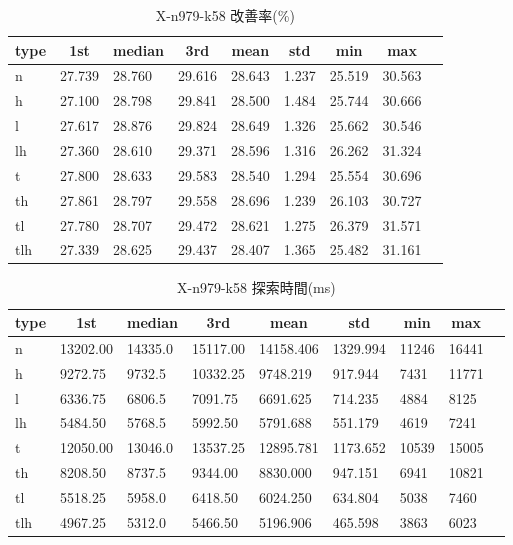 \begin{table}[htbp]
    \centering
    \caption{X-n979-k58 改善率(\%)}
    \begin{tabular}{|l|l|l|l|l|l|l|l|l|}\hline
    \multicolumn{1}{|c|}{\textbf{type}}
    &\multicolumn{1}{|c|}{\textbf{1st}}
    &\multicolumn{1}{c|}{\textbf{median}}
    &\multicolumn{1}{c|}{\textbf{3rd}}
    &\multicolumn{1}{c|}{\textbf{mean}}
    &\multicolumn{1}{c|}{\textbf{std}}
    &\multicolumn{1}{c|}{\textbf{min}}
    &\multicolumn{1}{c|}{\textbf{max}}\\\hline
	n & 27.739 & 28.760 & 29.616 & 28.643 & 1.237 & 25.519 & 30.563\\\hline
	h & 27.100 & 28.798 & 29.841 & 28.500 & 1.484 & 25.744 & 30.666\\\hline
	l & 27.617 & 28.876 & 29.824 & 28.649 & 1.326 & 25.662 & 30.546\\\hline
	lh & 27.360 & 28.610 & 29.371 & 28.596 & 1.316 & 26.262 & 31.324\\\hline
	t & 27.800 & 28.633 & 29.583 & 28.540 & 1.294 & 25.554 & 30.696\\\hline
	th & 27.861 & 28.797 & 29.558 & 28.696 & 1.239 & 26.103 & 30.727\\\hline
	tl & 27.780 & 28.707 & 29.472 & 28.621 & 1.275 & 26.379 & 31.571\\\hline
	tlh & 27.339 & 28.625 & 29.437 & 28.407 & 1.365 & 25.482 & 31.161\\\hline
	\end{tabular}
\end{table}
\begin{table}[htbp]
    \centering
    \caption{X-n979-k58 探索時間(ms)}
    \begin{tabular}{|l|l|l|l|l|l|l|l|l|}\hline
    \multicolumn{1}{|c|}{\textbf{type}}
    &\multicolumn{1}{|c|}{\textbf{1st}}
    &\multicolumn{1}{c|}{\textbf{median}}
    &\multicolumn{1}{c|}{\textbf{3rd}}
    &\multicolumn{1}{c|}{\textbf{mean}}
    &\multicolumn{1}{c|}{\textbf{std}}
    &\multicolumn{1}{c|}{\textbf{min}}
    &\multicolumn{1}{c|}{\textbf{max}}\\\hline
	n & 13202.00 & 14335.0 & 15117.00 & 14158.406 & 1329.994 & 11246 & 16441\\\hline
	h & 9272.75 & 9732.5 & 10332.25 & 9748.219 & 917.944 & 7431 & 11771\\\hline
	l & 6336.75 & 6806.5 & 7091.75 & 6691.625 & 714.235 & 4884 & 8125\\\hline
	lh & 5484.50 & 5768.5 & 5992.50 & 5791.688 & 551.179 & 4619 & 7241\\\hline
	t & 12050.00 & 13046.0 & 13537.25 & 12895.781 & 1173.652 & 10539 & 15005\\\hline
	th & 8208.50 & 8737.5 & 9344.00 & 8830.000 & 947.151 & 6941 & 10821\\\hline
	tl & 5518.25 & 5958.0 & 6418.50 & 6024.250 & 634.804 & 5038 & 7460\\\hline
	tlh & 4967.25 & 5312.0 & 5466.50 & 5196.906 & 465.598 & 3863 & 6023\\\hline
	\end{tabular}
\end{table}
